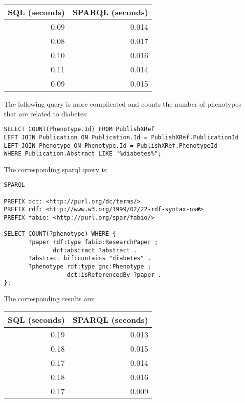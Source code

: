 \begin{center}
\begin{tabular}{rr}
SQL (seconds) & SPARQL (seconds)\\[0pt]
\hline
0.09 & 0.014\\[0pt]
0.08 & 0.017\\[0pt]
0.10 & 0.016\\[0pt]
0.11 & 0.014\\[0pt]
0.09 & 0.015\\[0pt]
\end{tabular}
\end{center}

The following query is more complicated and counts the number of phenotypes that are related to diabetes:


\begin{Verbatim}[frame=single]
SELECT COUNT(Phenotype.Id) FROM PublishXRef
LEFT JOIN Publication ON Publication.Id = PublishXRef.PublicationId
LEFT JOIN Phenotype ON Phenotype.Id = PublishXRef.PhenotypeId
WHERE Publication.Abstract LIKE "%diabetes%";
\end{Verbatim}

The corresponding sparql query is:

\begin{Verbatim}[frame=single]
SPARQL

PREFIX dct: <http://purl.org/dc/terms/>
PREFIX rdf: <http://www.w3.org/1999/02/22-rdf-syntax-ns#>
PREFIX fabio: <http://purl.org/spar/fabio/>

SELECT COUNT(?phenotype) WHERE {
       ?paper rdf:type fabio:ResearchPaper ;
              dct:abstract ?abstract .
       ?abstract bif:contains "diabetes" .
       ?phenotype rdf:type gnc:Phenotype ;
                  dct:isReferencedBy ?paper .
};  
\end{Verbatim}

The corresponding results are:

\begin{center}
\begin{tabular}{rr}
SQL (seconds) & SPARQL (seconds)\\[0pt]
\hline
0.19 & 0.013\\[0pt]
0.18 & 0.015\\[0pt]
0.17 & 0.014\\[0pt]
0.18 & 0.016\\[0pt]
0.17 & 0.009\\[0pt]
\end{tabular}
\end{center}

